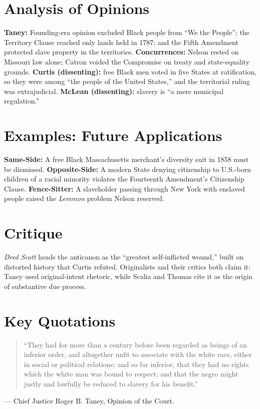 \documentclass[12pt]{article}
\begin{document}
\section{Analysis of Opinions}
\textbf{Taney:} Founding-era opinion excluded Black people from ``We the People''; the Territory Clause reached only lands held in 1787; and the Fifth Amendment protected slave property in the territories. \textbf{Concurrences:} Nelson rested on Missouri law alone; Catron voided the Compromise on treaty and state-equality grounds. \textbf{Curtis (dissenting):} free Black men voted in five States at ratification, so they were among ``the people of the United States,'' and the territorial ruling was extrajudicial. \textbf{McLean (dissenting):} slavery is ``a mere municipal regulation.''

\section{Examples: Future Applications}
\textbf{Same-Side:} A free Black Massachusetts merchant's diversity suit in 1858 must be dismissed. \textbf{Opposite-Side:} A modern State denying citizenship to U.S.-born children of a racial minority violates the Fourteenth Amendment's Citizenship Clause. \textbf{Fence-Sitter:} A slaveholder passing through New York with enslaved people raised the \textit{Lemmon} problem Nelson reserved.

\section{Critique}
\textit{Dred Scott} heads the anticanon as the ``greatest self-inflicted wound,'' built on distorted history that Curtis refuted. Originalists and their critics both claim it: Taney used original-intent rhetoric, while Scalia and Thomas cite it as the origin of substantive due process.

\section{Key Quotations}
\begin{quote}
``They had for more than a century before been regarded as beings of an inferior order, and altogether unfit to associate with the white race, either in social or political relations; and so far inferior, that they had no rights which the white man was bound to respect; and that the negro might justly and lawfully be reduced to slavery for his benefit.''
\end{quote}
\noindent --- Chief Justice Roger B. Taney, Opinion of the Court.
\end{document}
